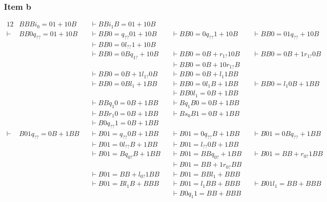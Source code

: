 {\subsubsection{Item b}
\begin{alignat*}{12}
	       & BBB i_0 =01+10B    &&\vdash BB i_1 B=01+10B    && \\
	\vdash & BB0 q_{??} =01+10B &&\vdash BB0= q_{??} 01+10B &&\vdash BB0=0 q_{??} 1+10B &&\vdash BB0=01 q_{??} +10B &&\\
	       &                    &&\vdash BB0=0 l_{??} 1+10B &&\\
		   &                    &&\vdash BB0=0B q_{1?} +10B &&\vdash BB0=0B+ r_{1?} 10B &&\vdash BB0=0B+1 r_{1?} 0B &&\\
		   &                    &&                          &&\vdash BB0=0B+10 r_{1?} B &&\\
		   &                    &&\vdash BB0=0B+1 l_{1?} 0B &&\vdash BB0=0B+ l_{1 } 1BB &&\\
		   &                    &&\vdash BB0=0B l_{1 } +1BB &&\vdash BB0=0 l_{1 } B+1BB &&\vdash BB0= l_{1 } 0B+1BB &&\\
		   &                    &&                          &&\vdash BB0 l_{1 } =0B+1BB &&\\
		   &                    &&\vdash BB q_{1 } 0=0B+1BB &&\vdash B q_{1 } B0=0B+1BB &&\\
		   &                    &&\vdash BB r_{1 } 0=0B+1BB &&\vdash B s_0 B1=0B+1BB    &&\\
		   &                    &&\vdash B0 q_{??} 1=0B+1BB &&\\
	\vdash & B01 q_{??} =0B+1BB &&\vdash B01= q_{??} 0B+1BB &&\vdash B01=0 q_{??} B+1BB &&\vdash B01=0B q_{??} +1BB &&\\
		   &                    &&\vdash B01=0 l_{??} B+1BB &&\vdash B01= l_{??} 0B+1BB &&\\
		   &                    &&\vdash B01=B q_{0?} B+1BB &&\vdash B01=BB q_{0?} +1BB &&\vdash B01=BB+ r_{0?} 1BB &&\\
		   &                    &&                          &&\vdash B01=BB+1 r_{0?} BB &&\\
		   &                    &&\vdash B01=BB+ l_{0?} 1BB &&\vdash B01=BB l_{1 } +BBB &&\\
		   &                    &&\vdash B01=B l_{1 } B+BBB &&\vdash B01= l_{1 } BB+BBB &&\vdash B01 l_{1 } =BB+BBB &&\\
		   &                    &&                          &&\vdash B0 q_{1 } 1=BB+BBB &&\\

\end{alignat*}}
